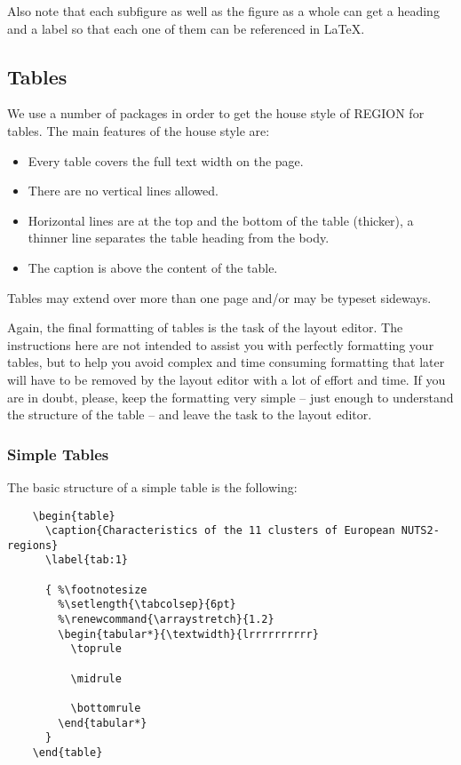 \documentclass[a4paper,twoside]{article}
\begin{document}
Also note that each subfigure as well as the figure as a whole can get a heading and a label so that each one of them can be referenced in \LaTeX.


\subsection{Tables}
\label{sec:4.2}

We use a number of packages in order to get the house style of REGION for tables. The main features of the house style are:
\begin{itemize}
  \item Every table covers the full text width on the page.
  \item There are no vertical lines allowed.
  \item Horizontal lines are at the top and the bottom of the table (thicker), a thinner line separates the table heading from the body. 
  \item The caption is above the content of the table.
\end{itemize}
Tables may extend over more than one page and/or may be typeset sideways. 

Again, the final formatting of tables is the task of the layout editor. The instructions here are not intended to assist you with perfectly formatting your tables, but to help you avoid complex and time consuming formatting that later will have to be removed by the layout editor with a lot of effort and time. If you are in doubt, please, keep the formatting very simple -- just enough to understand the structure of the table -- and leave the task to the layout editor.

\subsubsection{Simple Tables}
\label{sec:4.2.1}

The basic structure of a simple table is the following:

\begin{verbatim}
    \begin{table}
      \caption{Characteristics of the 11 clusters of European NUTS2-regions}
      \label{tab:1}

      { %\footnotesize
        %\setlength{\tabcolsep}{6pt}
        %\renewcommand{\arraystretch}{1.2}
        \begin{tabular*}{\textwidth}{lrrrrrrrrrr}
          \toprule

          \midrule

          \bottomrule
        \end{tabular*}
      }
    \end{table}
\end{verbatim}
\end{document}
